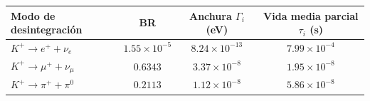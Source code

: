 \begin{problema}
\begin{center}
\small
\begin{tabular}{lccc}
\toprule
\textbf{Modo de desintegración} & \textbf{BR} & \textbf{Anchura } $\Gamma_i$ \textbf{(eV)} & \textbf{Vida media parcial } $\tau_i$ \textbf{(s)} \\
\midrule
$K^+ \rightarrow e^+ + \nu_e$ & $1.55 \times 10^{-5}$ & $8.24 \times 10^{-13}$ & $7.99 \times 10^{-4}$ \\
$K^+ \rightarrow \mu^+ + \nu_\mu$ & $0.6343$ & $3.37 \times 10^{-8}$ & $1.95 \times 10^{-8}$ \\
$K^+ \rightarrow \pi^+ + \pi^0$ & $0.2113$ & $1.12 \times 10^{-8}$ & $5.86 \times 10^{-8}$ \\
\bottomrule
\end{tabular}
\end{center}
\end{problema}


